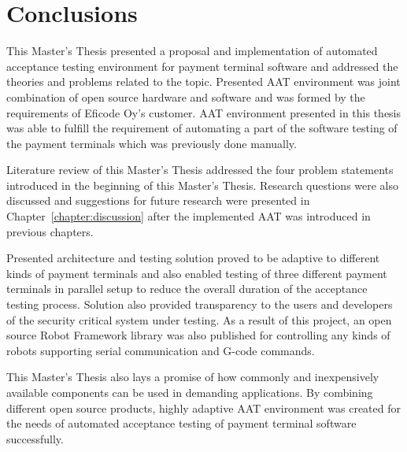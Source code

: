 
\chapter{Conclusions}
\label{chapter:conclusions}

This Master's Thesis presented a proposal and implementation of automated acceptance testing environment for payment terminal software and addressed the theories and problems related to the topic. Presented AAT environment was joint combination of open source hardware and software and was formed by the requirements of Eficode Oy's customer. AAT environment presented in this thesis was able to fulfill the requirement of automating a part of the software testing of the payment terminals which was previously done manually.

Literature review of this Master's Thesis addressed the four problem statements introduced in the beginning of this Master's Thesis. Research questions were also discussed and suggestions for future research were presented in Chapter~\ref{chapter:discussion} after the implemented AAT was introduced in previous chapters.

Presented architecture and testing solution proved to be adaptive to different kinds of payment terminals and also enabled testing of three different payment terminals in parallel setup to reduce the overall duration of the acceptance testing process. Solution also provided transparency to the users and developers of the security critical system under testing. As a result of this project, an open source Robot Framework library was also published for controlling any kinds of robots supporting serial communication and G-code commands.

This Master's Thesis also lays a promise of how commonly and inexpensively available components can be used in demanding applications. By combining different open source products, highly adaptive AAT environment was created for the needs of automated acceptance testing of payment terminal software successfully.
